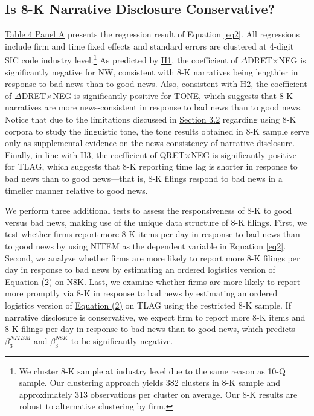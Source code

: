 \documentclass[letterpaper,12pt]{article}
\begin{document}
\begin{spacing}{1.5}
\subsection{Is 8-K Narrative Disclosure Conservative?}
\noindent \hyperref[T4PA]{Table 4 Panel A} presents the regression result of Equation \eqref{eq2}. All regressions include firm and time fixed effects and standard errors are clustered at 4-digit SIC code industry level.\footnote{We cluster 8-K sample at industry level due to the same reason as 10-Q sample. Our clustering approach yields 382 clusters in 8-K sample and approximately 313 observations per cluster on average. Our 8-K results are robust to alternative clustering by firm. } As predicted by \hyperref[h1]{H1}, the coefficient of $\Delta$DRET$\times$NEG is significantly negative for NW, consistent with 8-K narratives being lengthier in response to bad news than to good news. Also, consistent with \hyperref[h2]{H2}, the coefficient of $\Delta$DRET$\times$NEG is significantly positive for TONE, which suggests that 8-K narratives are more news-consistent in response to bad news than to good news. Notice that due to the limitations discussed in \hyperref[sec3.2]{Section 3.2} regarding using 8-K corpora to study the linguistic tone, the tone results obtained in 8-K sample serve only as supplemental evidence on the news-consistency of narrative disclosure. Finally, in line with \hyperref[h3]{H3}, the coefficient of QRET$\times$NEG is significantly positive for TLAG, which suggests that 8-K reporting time lag is shorter in response to bad news than to good news---that is, 8-K filings respond to bad news in a timelier manner relative to good news. 

We perform three additional tests to assess the responsiveness of 8-K to good versus bad news, making use of the unique data structure of 8-K filings. First, we test whether firms report more 8-K items per day in response to bad news than to good news by using NITEM as the dependent variable in Equation \eqref{eq2}. Second, we analyze whether firms are more likely to report more 8-K filings per day in response to bad news by estimating an ordered logistics version of \hyperref[eq2]{Equation (2)} on N8K. Last, we examine whether firms are more likely to report more promptly via 8-K in response to bad news by estimating an ordered logistics version of \hyperref[eq2]{Equation (2)} on TLAG using the restricted 8-K sample. If narrative disclosure is conservative, we expect firm to report more 8-K items and 8-K filings per day in response to bad news than to good news, which predicts $\beta_3^{NITEM}$ and $\beta_3^{N8K}$ to be significantly negative.


\end{spacing}
\end{document}
